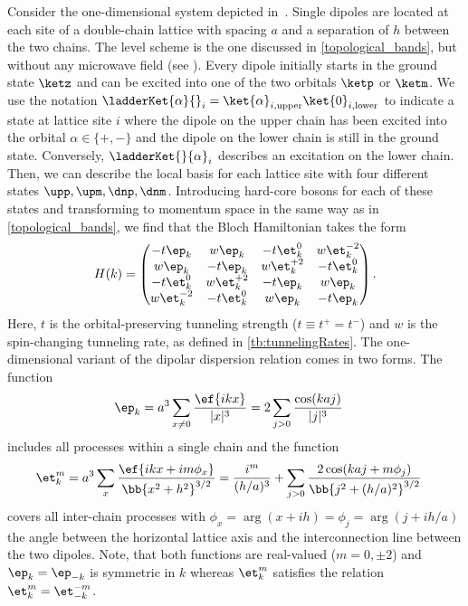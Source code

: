 Consider the one-dimensional system depicted in~.
Single dipoles are located at each site of a double-chain lattice with spacing $a$ and a separation of $h$ between the two chains.
The level scheme is the one discussed in \cref{topological_bands}, but without any microwave field (see ). Every dipole initially starts in the ground state $\ketz$ and can be excited into one of the two orbitals $\ketp$ or $\ketm$.
We use the notation $\ladderKet{\alpha}{}_i = \ket{\alpha}_{i,\text{upper}} \ket{0}_{i,\text{lower}}$ to indicate a state at lattice site $i$ where the dipole on the upper chain has been excited into the orbital $\alpha \in \{+, -\}$ and the dipole on the lower chain is still in the ground state.
Conversely, $\ladderKet{}{\alpha}_i$ describes an excitation on the lower chain.
Then, we can describe the local basis for each lattice site with four different states $\upp, \upm, \dnp, \dnm$.
Introducing hard-core bosons for each of these states and transforming to momentum space in the same way as in \cref{topological_bands}, we find that the Bloch Hamiltonian takes the form
\begin{align}
    H(k) =
    \begin{pmatrix}
        -t \ep_k  & w \ep_k & -t \et^0_k & w \et^{-2}_k \\
        w \ep_k & -t \ep_k  & w \et^{+2}_k & -t \et^0_k \\
        -t \et^0_{k} & w \et^{+2}_{k}  & -t \ep_k  & w \ep_k \\
        w \et^{-2}_{k} & -t \et^0_{k} & w \ep_k & -t \ep_k
    \end{pmatrix}.
\end{align}
Here, $t$ is the orbital-preserving tunneling strength ($t \equiv t^+ = t^-$) and $w$ is the spin-changing tunneling rate, as defined in \cref{tb:tunnelingRates}.
The one-dimensional variant of the dipolar dispersion relation comes in two forms. The function
\begin{align}
    \ep_k &= a^3 \sum_{x\ne 0} \frac{\ef{i k x}}{|x|^3} = 2 \sum_{j>0} \frac{\cos(k a j)}{|j|^3}
\end{align}
includes all processes within a single chain and the function
\begin{align}
    \et^m_k &= a^3 \sum_{x} \frac{\ef{i k x + i m \phi_x}}{\bb{x^2 + h^2}^{3/2}}
    = \frac{i^m}{(h/a)^3} + \sum_{j>0} \frac{2\cos(ka j+m\phi_j)}{\bb{j^2+(h/a)^2}^{3/2}}
\end{align}
covers all inter-chain processes with $\phi_x = \arg(x+ i h)=\phi_j=\arg(j+ i h/a)$ the angle between the horizontal lattice axis and the interconnection line between the two dipoles.
Note, that both functions are real-valued ($m = 0, \pm 2$) and $\ep_k=\ep_{-k}$ is symmetric in $k$ whereas $\et^m_k$ satisfies the relation $\et^m_k=\et^{-m}_{-k}$.

